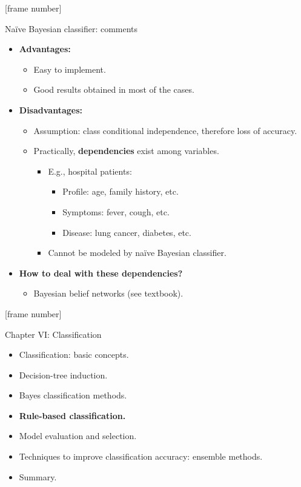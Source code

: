 \documentclass[aspectratio=169,t,table]{beamer}
\begin{document}
  {
    [frame number]
    \begin{frame}{Naïve Bayesian classifier: comments}
      \begin{itemize}
        \item \textbf{Advantages:}
        \begin{itemize}
          \item Easy to implement.
          \item Good results obtained in most of the cases.
        \end{itemize}
        \item \textbf{Disadvantages:}
        \begin{itemize}
          \item Assumption: class conditional independence, therefore loss of accuracy.
          \item Practically, \textbf{dependencies} exist among variables.
          \begin{itemize}
            \item E.g., hospital patients:
            \begin{itemize}
              \item Profile: age, family history, etc.
              \item Symptoms: fever, cough, etc.
              \item Disease: lung cancer, diabetes, etc.
            \end{itemize}
            \item Cannot be modeled by naïve Bayesian classifier.
          \end{itemize}
        \end{itemize}
      \item \textbf{How to deal with these dependencies?}
      \begin{itemize}
        \item Bayesian belief networks (see textbook).
      \end{itemize}
      \end{itemize}
    \end{frame}
  }

  {
    [frame number]
    \begin{frame}{Chapter VI: Classification}
        \begin{itemize}
            \item Classification: basic concepts.
            \item Decision-tree induction.
            \item Bayes classification methods.
            \item \textbf{Rule-based classification.}
            \item Model evaluation and selection.
            \item Techniques to improve classification accuracy: ensemble methods.
            \item Summary.
        \end{itemize}
    \end{frame}
  }
\end{document}
